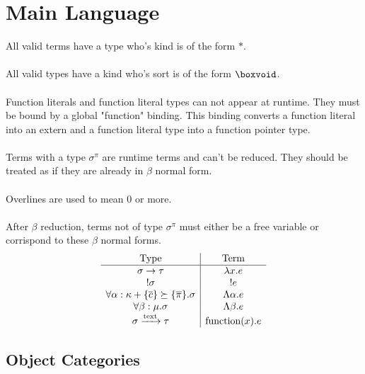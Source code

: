 \documentclass {article}
\begin{document}
\tableofcontents


\section{Main Language}

All valid terms have a type who's kind is of the form $ * $. \\
\\
All valid types have a kind who's sort is of the form $ \boxvoid $.\\
\\
Function literals and function literal types can not appear at runtime. They must be bound by a global "function" binding.
This binding converts a function literal into an extern and a function literal type into a function pointer type. \\
\\
Terms with a type $ \sigma^\pi $ are runtime terms and can't be reduced.
They should be treated as if they are already in $ \beta $ normal form. \\
\\
Overlines are used to mean 0 or more. \\
\\
After $ \beta $ reduction, terms not of type $ \sigma^\pi $ must either be a free variable or corrispond to these $ \beta $ normal forms. \\
\begin{gather*}
\begin{array}{c | c}
\text{Type} & \text{Term} \\
\hline
\sigma \to \tau & \lambda x. e \\
!\sigma & !e \\
\forall \alpha : \kappa + \{ \overline c \} \succeq \{ \overline \pi \}. \sigma & \Lambda \alpha. e  \\
\forall \beta : \mu. \sigma & \Lambda \beta. e \\
\sigma \xrightarrow{\text{text}} \tau & \text{function}(x). e \\
\end{array}
\\
\end{gather*}

\subsection{Object Categories}
\end{document}
